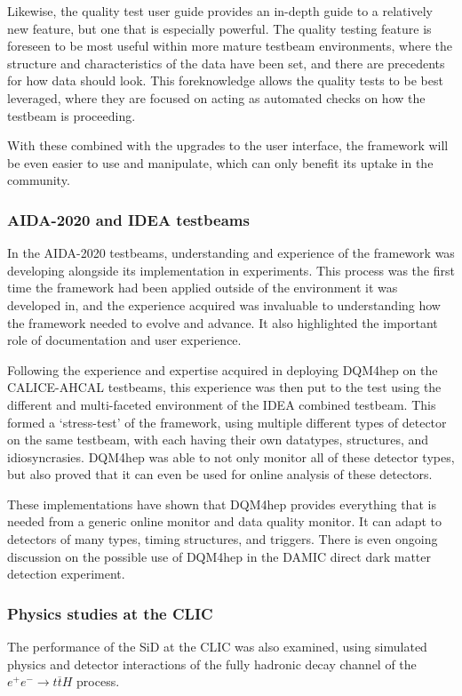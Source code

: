 Likewise, the quality test user guide provides an in-depth guide to a relatively new feature, but one that is especially powerful. The quality testing feature is foreseen to be most useful within more mature testbeam environments, where the structure and characteristics of the data have been set, and there are precedents for how data should look. This foreknowledge allows the quality tests to be best leveraged, where they are focused on acting as automated checks on how the testbeam is proceeding.

With these combined with the upgrades to the user interface, the framework will be even easier to use and manipulate, which can only benefit its uptake in the community.

\subsubsection*{\acrshort{AIDA}-2020 and IDEA testbeams}
In the \acrshort{AIDA}-2020 testbeams, understanding and experience of the framework was developing alongside its implementation in experiments. This process was the first time the framework had been applied outside of the environment it was developed in, and the experience acquired was invaluable to understanding how the framework needed to evolve and advance. It also highlighted the important role of documentation and user experience.

Following the experience and expertise acquired in deploying \acrshort{DQM4hep} on the \acrshort{CALICE}-\acrshort{AHCAL} testbeams, this experience was then put to the test using the different and multi-faceted environment of the \acrshort{IDEA} combined testbeam. This formed a `stress-test' of the framework, using multiple different types of detector on the same testbeam, with each having their own datatypes, structures, and idiosyncrasies. \acrshort{DQM4hep} was able to not only monitor all of these detector types, but also proved that it can even be used for online analysis of these detectors.

These implementations have shown that \acrshort{DQM4hep} provides everything that is needed from a generic online monitor and data quality monitor. It can adapt to detectors of many types, timing structures, and triggers. There is even ongoing discussion on the possible use of \acrshort{DQM4hep} in the \acrshort{DAMIC} direct dark matter detection experiment. 

\subsubsection*{Physics studies at the \acrlong{CLIC}}
The performance of the \acrshort{SiD} at the \acrlong{CLIC} was also examined, using simulated physics and detector interactions of the fully hadronic decay channel of the $e^+ e^- \rightarrow t \overline{t} H$ process. 

